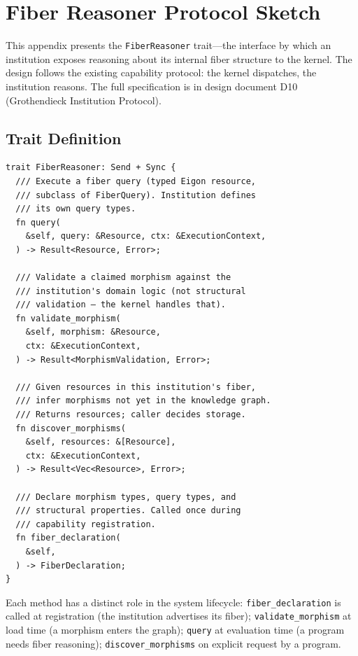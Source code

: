 \documentclass[10pt,twocolumn,letterpaper]{article}
\newcommand{\code}[1]{\texttt{\small #1}}
\begin{document}
\appendix
\section{Fiber Reasoner Protocol Sketch}
\label{app:fiber}

This appendix presents the \code{FiberReasoner} trait---the interface by which an institution exposes reasoning about its internal fiber structure to the kernel.
The design follows the existing capability protocol: the kernel dispatches, the institution reasons.
The full specification is in design document D10 (Grothendieck Institution Protocol).

\subsection{Trait Definition}

{\scriptsize
\begin{verbatim}
trait FiberReasoner: Send + Sync {
  /// Execute a fiber query (typed Eigon resource,
  /// subclass of FiberQuery). Institution defines
  /// its own query types.
  fn query(
    &self, query: &Resource, ctx: &ExecutionContext,
  ) -> Result<Resource, Error>;

  /// Validate a claimed morphism against the
  /// institution's domain logic (not structural
  /// validation — the kernel handles that).
  fn validate_morphism(
    &self, morphism: &Resource,
    ctx: &ExecutionContext,
  ) -> Result<MorphismValidation, Error>;

  /// Given resources in this institution's fiber,
  /// infer morphisms not yet in the knowledge graph.
  /// Returns resources; caller decides storage.
  fn discover_morphisms(
    &self, resources: &[Resource],
    ctx: &ExecutionContext,
  ) -> Result<Vec<Resource>, Error>;

  /// Declare morphism types, query types, and
  /// structural properties. Called once during
  /// capability registration.
  fn fiber_declaration(
    &self,
  ) -> FiberDeclaration;
}
\end{verbatim}
}

Each method has a distinct role in the system lifecycle:
\code{fiber\_declaration} is called at registration (the institution advertises its fiber);
\code{validate\_morphism} at load time (a morphism enters the graph);
\code{query} at evaluation time (a program needs fiber reasoning);
\code{discover\_morphisms} on explicit request by a program.
\end{document}
